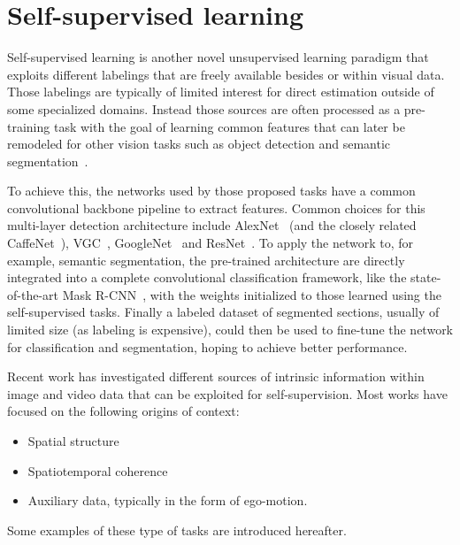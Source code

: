 \section{Self-supervised learning}
Self-supervised learning is another novel unsupervised learning paradigm that exploits different labelings that are freely available besides or within visual data. Those labelings are typically of limited interest for direct estimation outside of some specialized domains. Instead those sources are often processed as a pre-training task with the goal of learning common features that can later be remodeled for other vision tasks such as object detection and semantic segmentation~\cite{misra2016}. 

To achieve this, the networks used by those proposed tasks have a common convolutional backbone pipeline to extract features. Common choices for this multi-layer detection architecture include AlexNet~\cite{krizhevsky2012} (and the closely related CaffeNet~\cite{jia2014}), VGC~\cite{simonyan2014}, GoogleNet~\cite{szegedy2015} and ResNet~\cite{he2016}. To apply the network to, for example, semantic segmentation, the pre-trained architecture are directly integrated into a complete convolutional classification framework, like the state-of-the-art Mask R-CNN~\cite{he2017}, with the weights initialized to those learned using the self-supervised tasks. Finally a labeled dataset of segmented sections, usually of limited size (as labeling is expensive), could then be used to fine-tune the network for classification and segmentation, hoping to achieve better performance.

Recent work has investigated different sources of intrinsic information within image and video data that can be exploited for self-supervision. Most works have focused on the following origins of context: 
\begin{itemize}
\item Spatial structure
\item Spatiotemporal coherence 
\item Auxiliary data, typically in the form of ego-motion.
\end{itemize}
Some examples of these type of tasks are introduced hereafter.

